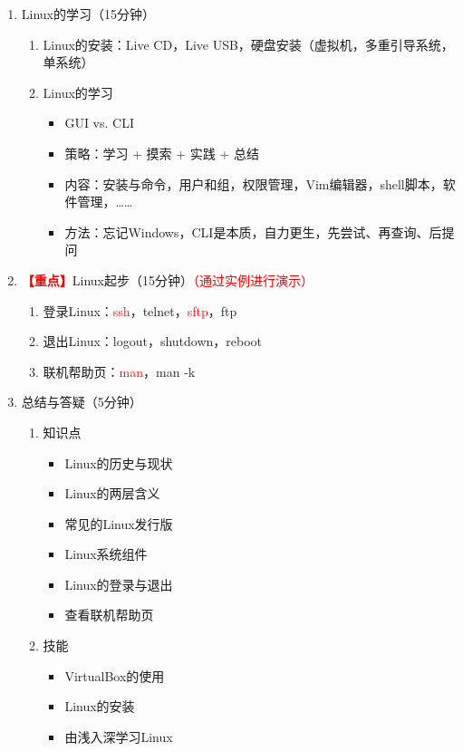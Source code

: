 \documentclass{TIJMUjiaoanLL}
\begin{document}
\begin{enumerate}
  \item Linux的学习（15分钟）
    \begin{enumerate}
      \item Linux的安装：Live CD，Live USB，硬盘安装（虚拟机，多重引导系统，单系统）
      \item Linux的学习
	\begin{itemize}
	  \item GUI vs. CLI
	  \item 策略：学习 + 摸索 + 实践 + 总结
	  \item 内容：安装与命令，用户和组，权限管理，Vim编辑器，shell脚本，软件管理，……
	  \item 方法：忘记Windows，CLI是本质，自力更生，先尝试、再查询、后提问
	\end{itemize}
    \end{enumerate}

  \item
    \textcolor{red}{\textbf{【重点】}}Linux起步（15分钟）\textcolor{red}{（通过实例进行演示）}
    \begin{enumerate}
      \item 登录Linux：\textcolor{red}{ssh}，telnet，\textcolor{red}{sftp}，ftp
      \item 退出Linux：logout，shutdown，reboot
      \item 联机帮助页：\textcolor{red}{man}，man -k
    \end{enumerate}


  \item 总结与答疑（5分钟）
    \begin{enumerate}
      \item 知识点
	\begin{itemize}
	  \item Linux的历史与现状
	  \item Linux的两层含义
	  \item 常见的Linux发行版
	  \item Linux系统组件
	  \item Linux的登录与退出
	  \item 查看联机帮助页
	\end{itemize}
      \item 技能
	\begin{itemize}
	  \item VirtualBox的使用
	  \item Linux的安装
	  \item 由浅入深学习Linux
	\end{itemize}
    \end{enumerate}
\end{enumerate}

\otherTail
\end{document}
